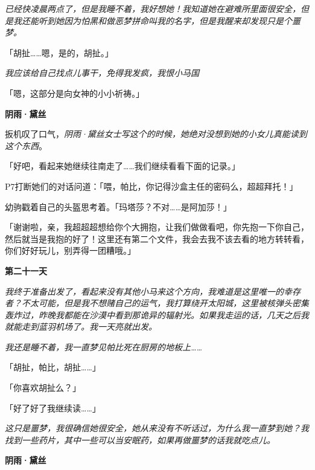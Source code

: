 \emph{已经快凌晨两点了，但是我睡不着，我好想她！我知道她在避难所里面很安全，但是我还能听到她因为怕黑和做恶梦拼命叫我的名字，但是我醒来却发现只是个噩梦。}

\medskip

「胡扯……嗯，是的，胡扯。」

\medskip

\emph{我应该给自己找点儿事干，免得我发疯，我恨小马国}

\medskip

「嗯，这部分是向女神的小小祈祷。」

\begin{flushright}
\textbf{阴雨·黛丝}
\end{flushright}

\medskip


扳机叹了口气，\emph{阴雨·黛丝女士写这个的时候，她绝对没想到她的小女儿真能读到这个东西}。

「好吧，看起来她继续往南走了……我们继续看看下面的记录。」

P7打断她们的对话问道：「喂，帕比，你记得沙盒主任的密码么，超超拜托！」

幼驹戳着自己的头盔思考着。「玛塔莎？不对……是阿加莎！」

「谢谢啦，亲，我超超超想给你个大拥抱，让我们做做看吧，你先抱一下你自己，然后就当是我抱的好了！这里还有第二个文件，我会去我不该去看的地方转转看，你们好好玩儿，别弄得一团糟哦。」

\medskip

\begin{center}
\textbf{第二十一天}
\end{center}

\emph{我终于准备出发了，看起来没有其他小马来这个方向，我难道是这里唯一的幸存者？不太可能，但是我不想赌自己的运气，我打算绕开太阳城，这里被核弹头密集轰炸过，昨晚我都能在沙漠中看到那诡异的辐射光。如果我走运的话，几天之后我就能走到蓝羽机场了。我一天亮就出发。}

\emph{我还是睡不着，我一直梦见帕比死在厨房的地板上……}

\medskip

「胡扯，帕比，胡扯……」

「你喜欢胡扯么？」

「好了好了我继续读……」

\medskip

\emph{这只是噩梦，我很确信她很安全，她从来没有不听话过，为什么我一直梦到她？我找到一些药片，其中一些可以当安眠药，如果再做噩梦的话我就吃点儿。}

\begin{flushright}
\textbf{阴雨·黛丝}
\end{flushright}

